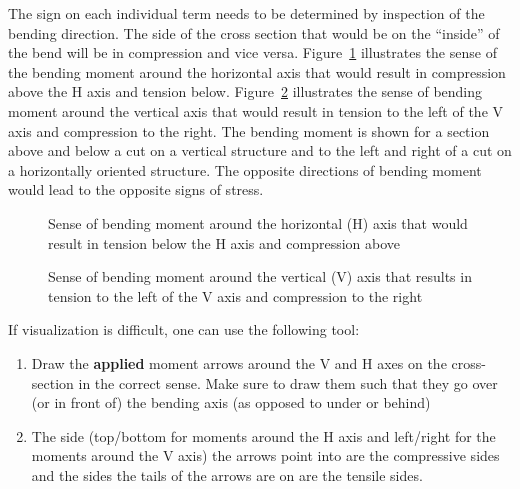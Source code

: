 \documentclass[
  letterpaper,
  DIV=11,
  numbers=noendperiod]{scrreprt}
\providecommand{\tightlist}{%
  \setlength{\itemsep}{0pt}\setlength{\parskip}{0pt}}\usepackage{longtable,booktabs,array}
\theoremstyle{definition}
\theoremstyle{remark}
\begin{document}
The sign on each individual term needs to be determined by inspection of
the bending direction. The side of the cross section that would be on
the ``inside'' of the bend will be in compression and vice versa.
Figure~\ref{fig-14.3} illustrates the sense of the bending moment around
the horizontal axis that would result in compression above the H axis
and tension below. Figure~\ref{fig-14.4} illustrates the sense of
bending moment around the vertical axis that would result in tension to
the left of the V axis and compression to the right. The bending moment
is shown for a section above and below a cut on a vertical structure and
to the left and right of a cut on a horizontally oriented structure. The
opposite directions of bending moment would lead to the opposite signs
of stress.

\begin{figure}


\caption{\label{fig-14.3}Sense of bending moment around the horizontal
(H) axis that would result in tension below the H axis and compression
above}

\end{figure}%

\begin{figure}


\caption{\label{fig-14.4}Sense of bending moment around the vertical (V)
axis that results in tension to the left of the V axis and compression
to the right}

\end{figure}%

If visualization is difficult, one can use the following tool:

\begin{enumerate}
\def\labelenumi{\arabic{enumi}.}
\tightlist
\item
  Draw the \textbf{applied} moment arrows around the V and H axes on the
  cross-section in the correct sense. Make sure to draw them such that
  they go over (or in front of) the bending axis (as opposed to under or
  behind)
\item
  The side (top/bottom for moments around the H axis and left/right for
  the moments around the V axis) the arrows point into are the
  compressive sides and the sides the tails of the arrows are on are the
  tensile sides.
\end{enumerate}
\end{document}
